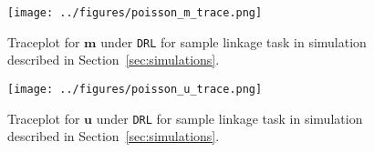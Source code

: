 \documentclass[12pt,letterpaper]{article}
\newcommand{\1}[1]{\mathbb{I}\!\left[#1\right]} %
\begin{document}
\begin{figure}[t]
	\centering
	\texttt{[image: ../figures/poisson\_m\_trace.png]}
	\caption{Traceplot for $\bm{m}$ under \texttt{DRL} for sample linkage task in simulation described in Section~\ref{sec:simulations}.}
	\label{fig:m-traceplot}
\end{figure}

\begin{figure}[t]
	\centering
	\texttt{[image: ../figures/poisson\_u\_trace.png]}
	\caption{Traceplot for $\bm{u}$ under \texttt{DRL} for sample linkage task in simulation described in Section~\ref{sec:simulations}.}
	\label{fig:u-traceplot}
\end{figure}
\end{document}
